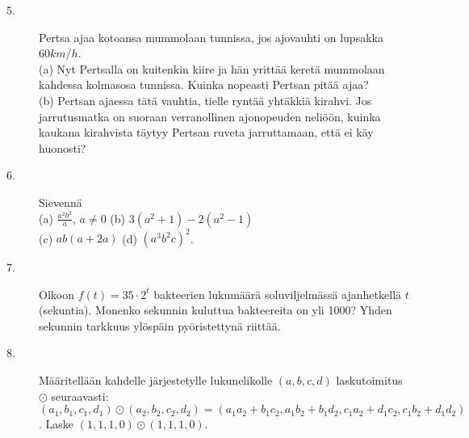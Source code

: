 \begin{description}
	\item[5.] Pertsa ajaa kotoansa mummolaan tunnissa, jos ajovauhti on lupsakka $60 km/h$. \\
	(a) Nyt Pertsalla on kuitenkin kiire ja hän yrittää keretä mummolaan kahdessa kolmasosa tunnissa. Kuinka nopeasti Pertsan pitää ajaa? \\
	(b) Pertsan ajaessa tätä vauhtia, tielle ryntää yhtäkkiä kirahvi. Jos jarrutusmatka on suoraan verranollinen ajonopeuden neliöön, kuinka kaukana kirahvista täytyy Pertsan ruveta jarruttamaan, että ei käy huonosti?
	\item[6.] Sievennä \\
	(a) $\frac{a^2 b^2}{a}$, $a \neq 0$ \qquad
	(b) $3(a^2+1)-2(a^2-1)$ \\
	(c) $ab(a+2a)$ \qquad
	(d) $(a^3 b^2 c)^2$.
	\item[7.] Olkoon $f(t) = 35 \cdot 2^t$ bakteerien lukumäärä soluviljelmässä ajanhetkellä $t$ (sekuntia). Monenko sekunnin kuluttua bakteereita on yli 1000? Yhden sekunnin tarkkuus ylöspäin pyöristettynä riittää.
	\item[8.] Määritellään kahdelle järjestetylle lukunelikolle $(a, b, c, d)$ laskutoimitus $\odot$ seuraavasti: $(a_1, b_1, c_1, d_1) \odot (a_2, b_2, c_2, d_2) = (a_1 a_2 + b_1 c_2, a_1 b_2 + b_1 d_2, c_1 a_2 + d_1 c_2, c_1 b_2 + d_1 d_2)$. Laske $(1, 1, 1, 0) \odot (1, 1, 1, 0)$.

\end{description}
